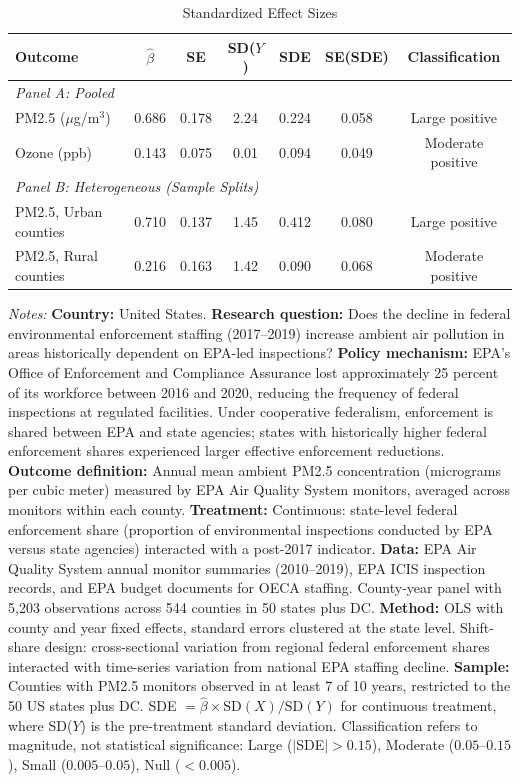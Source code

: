 \begin{table}[htbp]
\centering
\caption{Standardized Effect Sizes}
\label{tab:sde}
\begin{tabular}{lcccccc}
\toprule
Outcome & $\hat{\beta}$ & SE & SD($Y$) & SDE & SE(SDE) & Classification \\
\midrule
\multicolumn{7}{l}{\textit{Panel A: Pooled}} \\[3pt]
PM2.5 ($\mu$g/m$^3$) & 0.686 & 0.178 & 2.24 & 0.224 & 0.058 & Large positive \\
Ozone (ppb) & 0.143 & 0.075 & 0.01 & 0.094 & 0.049 & Moderate positive \\[6pt]
\multicolumn{7}{l}{\textit{Panel B: Heterogeneous (Sample Splits)}} \\[3pt]
PM2.5, Urban counties & 0.710 & 0.137 & 1.45 & 0.412 & 0.080 & Large positive \\
PM2.5, Rural counties & 0.216 & 0.163 & 1.42 & 0.090 & 0.068 & Moderate positive \\
\bottomrule
\end{tabular}
\par\vspace{4pt}\begin{minipage}{\textwidth}\footnotesize
\textit{Notes:} \textbf{Country:} United States. \textbf{Research question:} Does the decline in federal environmental enforcement staffing (2017--2019) increase ambient air pollution in areas historically dependent on EPA-led inspections? \textbf{Policy mechanism:} EPA's Office of Enforcement and Compliance Assurance lost approximately 25 percent of its workforce between 2016 and 2020, reducing the frequency of federal inspections at regulated facilities. Under cooperative federalism, enforcement is shared between EPA and state agencies; states with historically higher federal enforcement shares experienced larger effective enforcement reductions. \textbf{Outcome definition:} Annual mean ambient PM2.5 concentration (micrograms per cubic meter) measured by EPA Air Quality System monitors, averaged across monitors within each county. \textbf{Treatment:} Continuous: state-level federal enforcement share (proportion of environmental inspections conducted by EPA versus state agencies) interacted with a post-2017 indicator. \textbf{Data:} EPA Air Quality System annual monitor summaries (2010--2019), EPA ICIS inspection records, and EPA budget documents for OECA staffing. County-year panel with 5,203 observations across 544 counties in 50 states plus DC. \textbf{Method:} OLS with county and year fixed effects, standard errors clustered at the state level. Shift-share design: cross-sectional variation from regional federal enforcement shares interacted with time-series variation from national EPA staffing decline. \textbf{Sample:} Counties with PM2.5 monitors observed in at least 7 of 10 years, restricted to the 50 US states plus DC. SDE $= \hat{\beta} \times \text{SD}(X) / \text{SD}(Y)$ for continuous treatment, where SD($Y$) is the pre-treatment standard deviation. Classification refers to magnitude, not statistical significance: Large ($|$SDE$| > 0.15$), Moderate ($0.05$--$0.15$), Small ($0.005$--$0.05$), Null ($< 0.005$).
\end{minipage}
\end{table}
